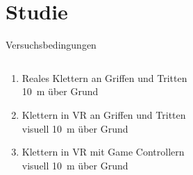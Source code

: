 \section{Studie}

\begin{frame}{Versuchsbedingungen}
\begin{columns}
	\begin{column}{0.5\textwidth}
		\begin{enumerate}[label=\textbf\textcolor{tracker}{\Alph*}]
			\item Reales Klettern an Griffen und Tritten
			\\\textcolor{source}{\SI{10}{\meter} über Grund}
			\item Klettern in \gls{VR} an Griffen und Tritten
			\\\textcolor{source}{visuell \SI{10}{\meter} über Grund}
			\item Klettern in \gls{VR} mit Game Controllern
			\\\textcolor{source}{visuell \SI{10}{\meter} über Grund}
		\end{enumerate}
	\end{column}
	\begin{column}{0.5\textwidth}
		\begin{center}
			\vspace*{-15mm}

\end{center}
\end{column}
\end{columns}
\end{frame}
